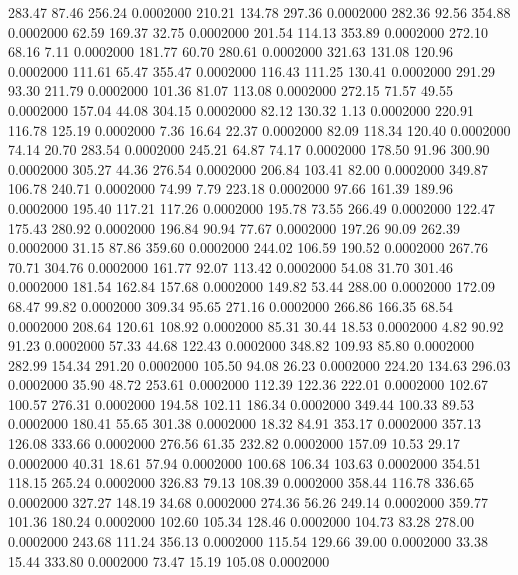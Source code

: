  283.47   87.46  256.24   0.0002000
 210.21  134.78  297.36   0.0002000
 282.36   92.56  354.88   0.0002000
  62.59  169.37   32.75   0.0002000
 201.54  114.13  353.89   0.0002000
 272.10   68.16    7.11   0.0002000
 181.77   60.70  280.61   0.0002000
 321.63  131.08  120.96   0.0002000
 111.61   65.47  355.47   0.0002000
 116.43  111.25  130.41   0.0002000
 291.29   93.30  211.79   0.0002000
 101.36   81.07  113.08   0.0002000
 272.15   71.57   49.55   0.0002000
 157.04   44.08  304.15   0.0002000
  82.12  130.32    1.13   0.0002000
 220.91  116.78  125.19   0.0002000
   7.36   16.64   22.37   0.0002000
  82.09  118.34  120.40   0.0002000
  74.14   20.70  283.54   0.0002000
 245.21   64.87   74.17   0.0002000
 178.50   91.96  300.90   0.0002000
 305.27   44.36  276.54   0.0002000
 206.84  103.41   82.00   0.0002000
 349.87  106.78  240.71   0.0002000
  74.99    7.79  223.18   0.0002000
  97.66  161.39  189.96   0.0002000
 195.40  117.21  117.26   0.0002000
 195.78   73.55  266.49   0.0002000
 122.47  175.43  280.92   0.0002000
 196.84   90.94   77.67   0.0002000
 197.26   90.09  262.39   0.0002000
  31.15   87.86  359.60   0.0002000
 244.02  106.59  190.52   0.0002000
 267.76   70.71  304.76   0.0002000
 161.77   92.07  113.42   0.0002000
  54.08   31.70  301.46   0.0002000
 181.54  162.84  157.68   0.0002000
 149.82   53.44  288.00   0.0002000
 172.09   68.47   99.82   0.0002000
 309.34   95.65  271.16   0.0002000
 266.86  166.35   68.54   0.0002000
 208.64  120.61  108.92   0.0002000
  85.31   30.44   18.53   0.0002000
   4.82   90.92   91.23   0.0002000
  57.33   44.68  122.43   0.0002000
 348.82  109.93   85.80   0.0002000
 282.99  154.34  291.20   0.0002000
 105.50   94.08   26.23   0.0002000
 224.20  134.63  296.03   0.0002000
  35.90   48.72  253.61   0.0002000
 112.39  122.36  222.01   0.0002000
 102.67  100.57  276.31   0.0002000
 194.58  102.11  186.34   0.0002000
 349.44  100.33   89.53   0.0002000
 180.41   55.65  301.38   0.0002000
  18.32   84.91  353.17   0.0002000
 357.13  126.08  333.66   0.0002000
 276.56   61.35  232.82   0.0002000
 157.09   10.53   29.17   0.0002000
  40.31   18.61   57.94   0.0002000
 100.68  106.34  103.63   0.0002000
 354.51  118.15  265.24   0.0002000
 326.83   79.13  108.39   0.0002000
 358.44  116.78  336.65   0.0002000
 327.27  148.19   34.68   0.0002000
 274.36   56.26  249.14   0.0002000
 359.77  101.36  180.24   0.0002000
 102.60  105.34  128.46   0.0002000
 104.73   83.28  278.00   0.0002000
 243.68  111.24  356.13   0.0002000
 115.54  129.66   39.00   0.0002000
  33.38   15.44  333.80   0.0002000
  73.47   15.19  105.08   0.0002000
